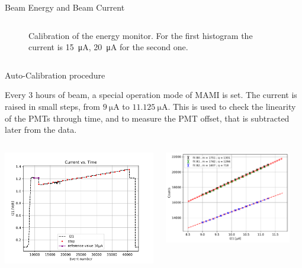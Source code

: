 \documentclass[9pt,a4paper]{beamer}
\begin{document}
\begin{frame}{Beam Energy and Beam Current}
\begin{columns}
\begin{column}{0.5\textwidth}
\begin{figure}
\caption{\footnotesize Calibration of the energy monitor. For the first histogram the current is \SI{15}{\micro \ampere}, \SI{20}{\micro \ampere} for the second one.}
\end{figure}
\end{column}
\end{columns}

\end{frame}

\begin{frame}{Auto-Calibration procedure}

Every 3 hours of beam, a special operation mode of MAMI is set. The current is raised in small steps, from $\SI{9}{\micro \ampere}$ to $\SI{11.125}{\micro \ampere}$. This is used to check the linearity of the PMTs through time, and to measure the PMT offset, that is subtracted later from the data.

\begin{columns}
\begin{column}{0.5\textwidth}
\includegraphics[width = \textwidth]{figures/Current.pdf}
\end{column}
\begin{column}{0.5\textwidth}
\includegraphics[width = 0.9\textwidth]{figures/fitB.pdf}
\end{column}
\end{columns}

\end{frame}
\end{document}
